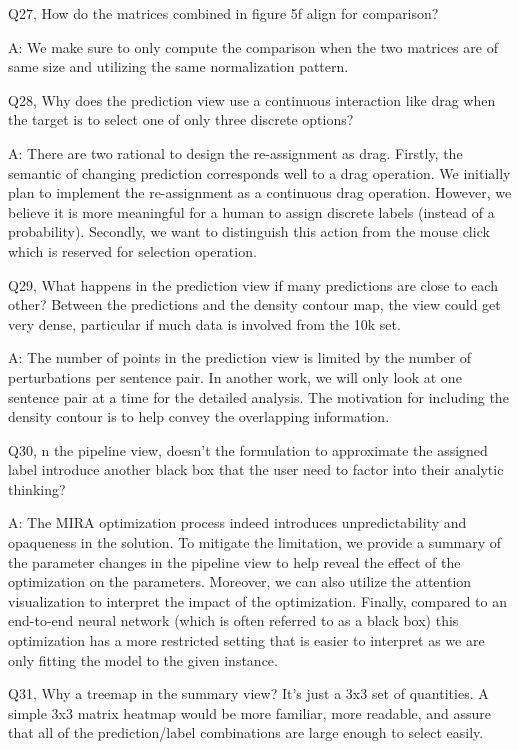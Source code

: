 Q27, How do the matrices combined in figure 5f align for comparison?

A: We make sure to only compute the comparison when the two matrices are of same size and utilizing the same normalization pattern.


Q28, Why does the prediction view use a continuous interaction like drag when the target is to select one of only three discrete options?

A: There are two rational to design the re-assignment as drag. Firstly, the semantic of changing prediction corresponds well to a drag operation. We initially plan to implement the re-assignment as a continuous drag operation. However, we believe it is more meaningful for a human to assign discrete labels (instead of a probability). Secondly, we want to distinguish this action from the mouse click which is reserved for selection operation.


Q29, What happens in the prediction view if many predictions are close to each other? Between the predictions and the density contour map, the view could get very dense, particular if much data is involved from the 10k set.

A: The number of points in the prediction view is limited by the number of perturbations per sentence pair. In another work, we will only look at one sentence pair at a time for the detailed analysis. The motivation for including the density contour is to help convey the overlapping information.


Q30, n the pipeline view, doesn't the formulation to approximate the assigned label introduce another black box that the user need to factor into their analytic thinking?

A: The MIRA optimization process indeed introduces unpredictability and opaqueness in the solution. To mitigate the limitation, we provide a summary of the parameter changes in the pipeline view to help reveal the effect of the optimization on the parameters. Moreover, we can also utilize the attention visualization to interpret the impact of the optimization. Finally, compared to an end-to-end neural network (which is often referred to as a black box) this optimization has a more restricted setting that is easier to interpret as we are only fitting the model to the given instance.


Q31, Why a treemap in the summary view? It's just a 3x3 set of quantities. A simple 3x3 matrix heatmap would be more familiar, more readable, and assure that all of the prediction/label combinations are large enough to select easily.

